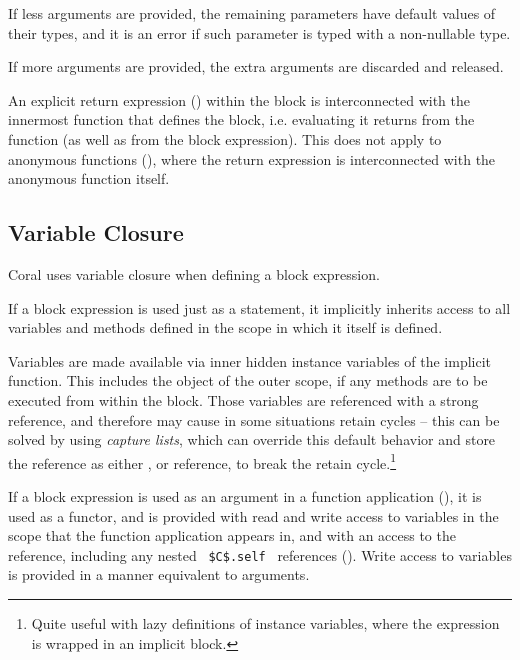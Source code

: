If less arguments are provided, the remaining parameters have default values of their types, and it is an error if such parameter is typed with a non-nullable type. 

If more arguments are provided, the extra arguments are discarded and released. 

An explicit return expression () within the block is interconnected with the innermost function that defines the block, i.e. evaluating it returns from the function (as well as from the block expression). This does not apply to anonymous functions (), where the return expression is interconnected with the anonymous function itself. 






\subsection{Variable Closure}
\label{sec:variable-closure}

Coral uses variable closure when defining a block expression. 

If a block expression is used just as a statement, it implicitly inherits access to all variables and methods defined in the scope in which it itself is defined. 

Variables are made available via inner hidden instance variables of the implicit function. This includes the  object of the outer scope, if any methods are to be executed from within the block. Those variables are referenced with a strong reference, and therefore may cause in some situations retain cycles -- this can be solved by using {\em capture lists}, which can override this default behavior and store the reference as either ,  or  reference, to break the retain cycle.\footnote{Quite useful with lazy definitions of instance variables, where the expression is wrapped in an implicit block.} 

If a block expression is used as an argument in a function application (), it is used as a functor, and is provided with read and write access to variables in the scope that the function application appears in, and with an access to the  reference, including any nested ~\lstinline!$C$.self!~ references (). Write access to variables is provided in a manner equivalent to  arguments. 

